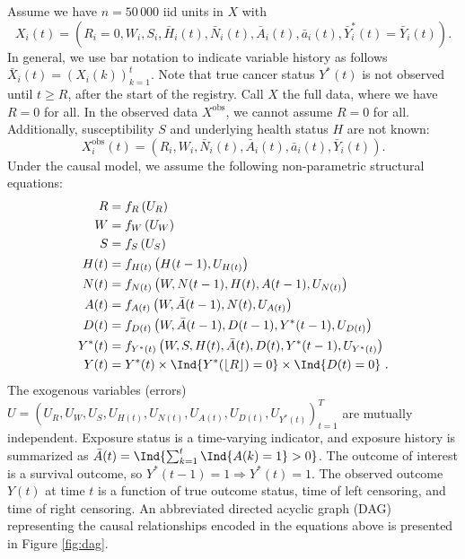\documentclass[
  11pt,
]{article}
\begin{document}
Assume we have \(n = 50\,000\) iid units in \(X\) with
\[X_i(t) = \left(R_i = 0, W_i, S_i, \bar H_i(t), \bar N_i(t), \bar A_i(t), \bar a_i(t), \bar Y^*_i(t) = \bar Y_i(t) \right).\]
In general, we use bar notation to indicate variable history as follows
\(\bar X_i(t) = \left(X_i(k)\right)_{k = 1}^t\). Note that true cancer
status \(Y^*(t)\) is not observed until \(t \ge R\), after the start of
the registry. Call \(X\) the full data, where we have \(R = 0\) for all.
In the observed data \(X^\text{obs}\), we cannot assume \(R = 0\) for
all. Additionally, susceptibility \(S\) and underlying health status
\(H\) are not known:
\[X^\text{obs}_i(t) = \left(R_i, W_i, \bar N_i(t), \bar A_i(t), \bar a_i(t), \bar Y_i(t) \right).\]
Under the causal model, we assume the following non-parametric
structural equations: \[\begin{aligned}
R     & = f_R \left( U_R \right) \\
W     & = f_W \left( U_W \right) \\
S     & = f_S \left( U_S \right) \\
H(t)  & = f_{H(t)} \left( H(t - 1), U_{H(t)} \right) \\
N(t)  & = f_{N(t)} \left( W, N(t - 1), H(t), A(t - 1), U_{N(t)} \right) \\
A(t)  & = f_{A(t)} \left( W, \bar A(t - 1), N(t), U_{A(t)} \right) \\
D(t)  & = f_{D(t)} \left( W, \bar A(t - 1), D(t - 1), Y^*(t - 1), U_{D(t)} \right) \\
Y^*(t)& = f_{Y^*(t)} \left(W, S, H(t), \bar A (t), D(t), Y^*(t - 1), U_{Y^*(t)} \right) \\
Y(t) & = Y^*(t) \times \Ind{Y^*(\lfloor R \rfloor) = 0} \times \Ind{D(t) = 0} \ .
\end{aligned}\] The exogenous variables (errors)
\(U = \left( U_R, U_W, U_S, U_{H(t)}, U_{N(t)}, U_{A(t)}, U_{D(t)}, U_{Y^*(t)} \right)_{t = 1}^{T}\)
are mutually independent. Exposure status is a time-varying indicator,
and exposure history is summarized as
\(\bar A(t) = \Ind{\sum_{k = 1}^t\Ind{A(k) = 1} > 0}\). The outcome of
interest is a survival outcome, so
\(Y^*(t - 1) = 1 \Rightarrow Y^*(t) = 1\). The observed outcome \(Y(t)\)
at time \(t\) is a function of true outcome status, time of left
censoring, and time of right censoring. An abbreviated directed acyclic
graph (DAG) representing the causal relationships encoded in the
equations above is presented in Figure \ref{fig:dag}.
\end{document}
